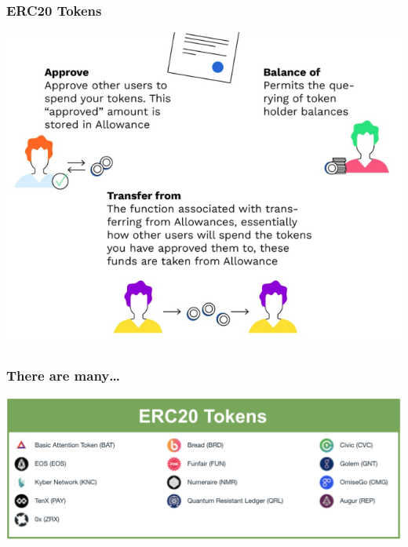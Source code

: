\documentclass[11pt]{beamer}  %
\begin{document}
\begin{frame}\frametitle{ERC20 Tokens}

  \begin{center}
    \includegraphics[scale=0.4,clip=false]{pictures/erc20_2.png}
  \end{center}
  
\end{frame}

\begin{frame}\frametitle{There are many\ldots}

  \begin{center}
    \includegraphics[scale=0.3,clip=false]{pictures/ERC20s.png}
  \end{center}
  
\end{frame}
\end{document}

